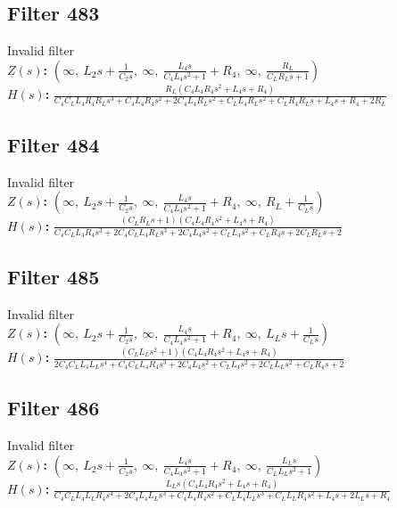 \documentclass{article}
\begin{document}
\subsection*{Filter 483}
Invalid filter \\ 
\textbf{$Z(s)$:} $\left( \infty, \  L_{2} s + \frac{1}{C_{2} s}, \  \infty, \  \frac{L_{4} s}{C_{4} L_{4} s^{2} + 1} + R_{4}, \  \infty, \  \frac{R_{L}}{C_{L} R_{L} s + 1}\right)$ \\ 
\textbf{$H(s)$:} $\frac{R_{L} \left(C_{4} L_{4} R_{4} s^{2} + L_{4} s + R_{4}\right)}{C_{4} C_{L} L_{4} R_{4} R_{L} s^{3} + C_{4} L_{4} R_{4} s^{2} + 2 C_{4} L_{4} R_{L} s^{2} + C_{L} L_{4} R_{L} s^{2} + C_{L} R_{4} R_{L} s + L_{4} s + R_{4} + 2 R_{L}}$ \\ 
\subsection*{Filter 484}
Invalid filter \\ 
\textbf{$Z(s)$:} $\left( \infty, \  L_{2} s + \frac{1}{C_{2} s}, \  \infty, \  \frac{L_{4} s}{C_{4} L_{4} s^{2} + 1} + R_{4}, \  \infty, \  R_{L} + \frac{1}{C_{L} s}\right)$ \\ 
\textbf{$H(s)$:} $\frac{\left(C_{L} R_{L} s + 1\right) \left(C_{4} L_{4} R_{4} s^{2} + L_{4} s + R_{4}\right)}{C_{4} C_{L} L_{4} R_{4} s^{3} + 2 C_{4} C_{L} L_{4} R_{L} s^{3} + 2 C_{4} L_{4} s^{2} + C_{L} L_{4} s^{2} + C_{L} R_{4} s + 2 C_{L} R_{L} s + 2}$ \\ 
\subsection*{Filter 485}
Invalid filter \\ 
\textbf{$Z(s)$:} $\left( \infty, \  L_{2} s + \frac{1}{C_{2} s}, \  \infty, \  \frac{L_{4} s}{C_{4} L_{4} s^{2} + 1} + R_{4}, \  \infty, \  L_{L} s + \frac{1}{C_{L} s}\right)$ \\ 
\textbf{$H(s)$:} $\frac{\left(C_{L} L_{L} s^{2} + 1\right) \left(C_{4} L_{4} R_{4} s^{2} + L_{4} s + R_{4}\right)}{2 C_{4} C_{L} L_{4} L_{L} s^{4} + C_{4} C_{L} L_{4} R_{4} s^{3} + 2 C_{4} L_{4} s^{2} + C_{L} L_{4} s^{2} + 2 C_{L} L_{L} s^{2} + C_{L} R_{4} s + 2}$ \\ 
\subsection*{Filter 486}
Invalid filter \\ 
\textbf{$Z(s)$:} $\left( \infty, \  L_{2} s + \frac{1}{C_{2} s}, \  \infty, \  \frac{L_{4} s}{C_{4} L_{4} s^{2} + 1} + R_{4}, \  \infty, \  \frac{L_{L} s}{C_{L} L_{L} s^{2} + 1}\right)$ \\ 
\textbf{$H(s)$:} $\frac{L_{L} s \left(C_{4} L_{4} R_{4} s^{2} + L_{4} s + R_{4}\right)}{C_{4} C_{L} L_{4} L_{L} R_{4} s^{4} + 2 C_{4} L_{4} L_{L} s^{3} + C_{4} L_{4} R_{4} s^{2} + C_{L} L_{4} L_{L} s^{3} + C_{L} L_{L} R_{4} s^{2} + L_{4} s + 2 L_{L} s + R_{4}}$ \\ 
\end{document}
